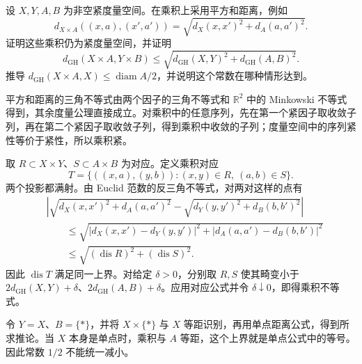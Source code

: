 \begin{exercise}\label{g3:ex:gh-product-stability}
	设 \(X,Y,A,B\) 为非空紧度量空间。在乘积上采用平方和距离，例如
	\[
		d_{X\times A}((x,a),(x',a'))
		=\sqrt{d_X(x,x')^2+d_A(a,a')^2}.
	\]
	证明这些乘积仍为紧度量空间，并证明
	\[
		d_{\mathrm{GH}}(X\times A,Y\times B)
		\le\sqrt{d_{\mathrm{GH}}(X,Y)^2+d_{\mathrm{GH}}(A,B)^2}.
	\]
	推导 \(d_{\mathrm{GH}}(X\times A,X)\le\operatorname{diam}A/2\)，并说明这个常数在哪种情形达到。
\end{exercise}
\begin{solution}
	平方和距离的三角不等式由两个因子的三角不等式和 \(\mathbb R^2\) 中的 Minkowski 不等式得到，其余度量公理直接成立。对乘积中的任意序列，先在第一个紧因子取收敛子列，再在第二个紧因子取收敛子列，得到乘积中收敛的子列；度量空间中的序列紧性等价于紧性，所以乘积紧。

	取 \(R\subset X\times Y\)、\(S\subset A\times B\) 为对应。定义乘积对应
	\[
		T=\{((x,a),(y,b)):(x,y)\in R,\ (a,b)\in S\}.
	\]
	两个投影都满射。由 Euclid 范数的反三角不等式，对两对这样的点有
	\[
	\begin{aligned}
		&\left|\sqrt{d_X(x,x')^2+d_A(a,a')^2}
		-\sqrt{d_Y(y,y')^2+d_B(b,b')^2}\right|\\
		&\qquad\le\sqrt{|d_X(x,x')-d_Y(y,y')|^2
		+|d_A(a,a')-d_B(b,b')|^2}\\
		&\qquad\le\sqrt{(\operatorname{dis}R)^2+(\operatorname{dis}S)^2}.
	\end{aligned}
	\]
	因此 \(\operatorname{dis}T\) 满足同一上界。对给定 \(\delta>0\)，分别取 \(R,S\) 使其畸变小于 \(2d_{\mathrm{GH}}(X,Y)+\delta\)、\(2d_{\mathrm{GH}}(A,B)+\delta\)。应用对应公式并令 \(\delta\downarrow0\)，即得乘积不等式。

	令 \(Y=X\)、\(B=\{*\}\)，并将 \(X\times\{*\}\) 与 \(X\) 等距识别，再用单点距离公式，得到所求推论。当 \(X\) 本身是单点时，乘积与 \(A\) 等距，这个上界就是单点公式中的等号。因此常数 \(1/2\) 不能统一减小。
\end{solution}

